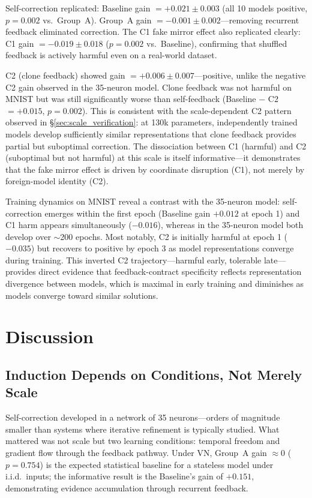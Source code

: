\documentclass[10pt]{article}
\begin{document}
Self-correction replicated: Baseline gain $= +0.021 \pm 0.003$ (all 10 models positive, $p = 0.002$ vs.\ Group~A). Group~A gain $= -0.001 \pm 0.002$---removing recurrent feedback eliminated correction. The C1 fake mirror effect also replicated clearly: C1 gain $= -0.019 \pm 0.018$ ($p = 0.002$ vs.\ Baseline), confirming that shuffled feedback is actively harmful even on a real-world dataset.

C2 (clone feedback) showed gain $= +0.006 \pm 0.007$---positive, unlike the negative C2 gain observed in the 35-neuron model. Clone feedback was not harmful on MNIST but was still significantly worse than self-feedback (Baseline $-$ C2 $= +0.015$, $p = 0.002$). This is consistent with the scale-dependent C2 pattern observed in \S\ref{sec:scale_verification}: at 130k parameters, independently trained models develop sufficiently similar representations that clone feedback provides partial but suboptimal correction. The dissociation between C1 (harmful) and C2 (suboptimal but not harmful) at this scale is itself informative---it demonstrates that the fake mirror effect is driven by coordinate disruption (C1), not merely by foreign-model identity (C2).

Training dynamics on MNIST reveal a contrast with the 35-neuron model: self-correction emerges within the first epoch (Baseline gain $+0.012$ at epoch 1) and C1 harm appears simultaneously ($-0.016$), whereas in the 35-neuron model both develop over $\sim$200 epochs. Most notably, C2 is initially harmful at epoch 1 ($-0.035$) but recovers to positive by epoch 3 as model representations converge during training. This inverted C2 trajectory---harmful early, tolerable late---provides direct evidence that feedback-contract specificity reflects representation divergence between models, which is maximal in early training and diminishes as models converge toward similar solutions.

\section{Discussion}

\subsection{Induction Depends on Conditions, Not Merely Scale}

Self-correction developed in a network of 35 neurons---orders of magnitude smaller than systems where iterative refinement is typically studied. What mattered was not scale but two learning conditions: temporal freedom and gradient flow through the feedback pathway. Under VN, Group~A gain $\approx 0$ ($p = 0.754$) is the expected statistical baseline for a stateless model under i.i.d.\ inputs; the informative result is the Baseline's gain of $+0.151$, demonstrating evidence accumulation through recurrent feedback.
\end{document}
